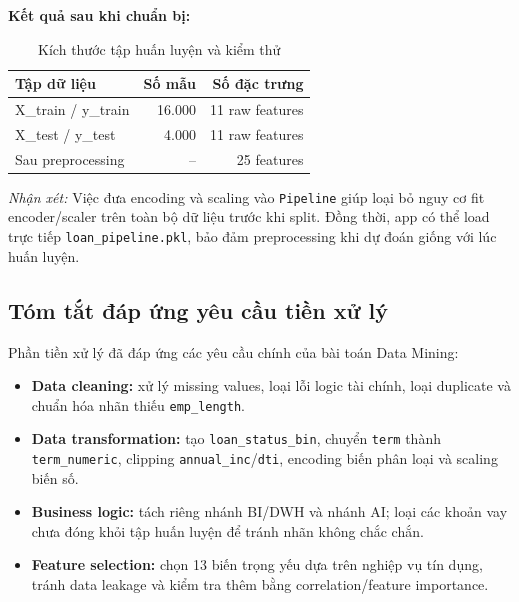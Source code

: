 \textbf{Kết quả sau khi chuẩn bị:}

\begin{table}[H]
    \centering
    \renewcommand{\arraystretch}{1.2}
    \begin{tabular}{|l|r|r|}
        \hline
        \textbf{Tập dữ liệu} & \textbf{Số mẫu} & \textbf{Số đặc trưng} \\ \hline
        X\_train / y\_train & 16.000 & 11 raw features \\ \hline
        X\_test / y\_test & 4.000 & 11 raw features \\ \hline
        Sau preprocessing & -- & 25 features \\ \hline
    \end{tabular}
    \caption{Kích thước tập huấn luyện và kiểm thử}
    \label{tab:train_test_size}
\end{table}

\textit{Nhận xét:} Việc đưa encoding và scaling vào \texttt{Pipeline} giúp loại bỏ nguy cơ fit encoder/scaler trên toàn bộ dữ liệu trước khi split. Đồng thời, app có thể load trực tiếp \texttt{loan\_pipeline.pkl}, bảo đảm preprocessing khi dự đoán giống với lúc huấn luyện.

\subsection{Tóm tắt đáp ứng yêu cầu tiền xử lý}
Phần tiền xử lý đã đáp ứng các yêu cầu chính của bài toán Data Mining:
\begin{itemize}
    \item \textbf{Data cleaning:} xử lý missing values, loại lỗi logic tài chính, loại duplicate và chuẩn hóa nhãn thiếu \texttt{emp\_length}.
    \item \textbf{Data transformation:} tạo \texttt{loan\_status\_bin}, chuyển \texttt{term} thành \texttt{term\_numeric}, clipping \texttt{annual\_inc}/\texttt{dti}, encoding biến phân loại và scaling biến số.
    \item \textbf{Business logic:} tách riêng nhánh BI/DWH và nhánh AI; loại các khoản vay chưa đóng khỏi tập huấn luyện để tránh nhãn không chắc chắn.
    \item \textbf{Feature selection:} chọn 13 biến trọng yếu dựa trên nghiệp vụ tín dụng, tránh data leakage và kiểm tra thêm bằng correlation/feature importance.
\end{itemize}
